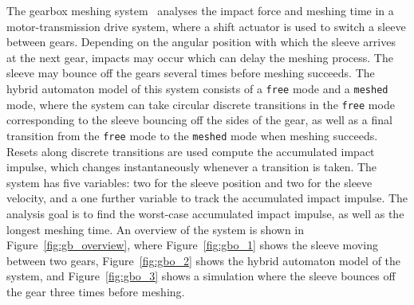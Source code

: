 The gearbox meshing system~\cite{chen2014motor} analyses the impact force and meshing time in a motor-transmission drive system,
where a shift actuator is used to switch a sleeve between gears.
%
Depending on the angular position with which the sleeve arrives at the next gear, impacts may occur which can delay the meshing process.
%
The sleeve may bounce off the gears several times before meshing succeeds.
%
The hybrid automaton model of this system consists of a \texttt{free} mode and a \texttt{meshed} mode, where the system can take circular
discrete transitions in the \texttt{free} mode corresponding to the sleeve bouncing off the sides of the gear, as well as a final transition
from the \texttt{free} mode to the \texttt{meshed} mode when meshing succeeds.
%
Resets along discrete transitions are used compute the accumulated impact impulse, which changes instantaneously whenever a transition is taken.
%
The system has five variables: two for the sleeve position and two for the sleeve velocity, and a one further variable to track the accumulated
impact impulse. 
%
The analysis goal is to find the worst-case accumulated impact impulse, as well as the longest meshing time.
%
An overview of the system is shown in Figure~\ref{fig:gb_overview}, where Figure~\ref{fig:gbo_1} shows the sleeve moving between two gears,
Figure~\ref{fig:gbo_2} shows the hybrid automaton model of the system, and Figure~\ref{fig:gbo_3} shows a simulation where the sleeve bounces off
the gear three times before meshing.


